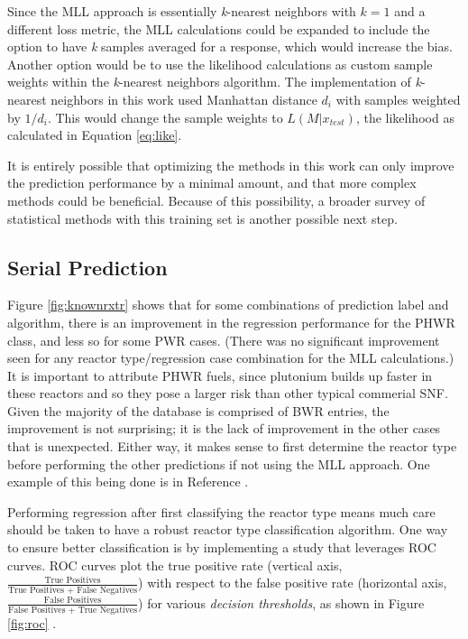 Since the \gls{MLL} approach is essentially \textit{k}-nearest neighbors with
$k=1$ and a different loss metric, the \gls{MLL} calculations could be expanded
to include the option to have \textit{k} samples averaged for a response, which
would increase the bias.  Another option would be to use the likelihood
calculations as custom sample weights within the \textit{k}-nearest neighbors
algorithm. The implementation of \textit{k}-nearest neighbors in this work used
Manhattan distance $d_i$ with samples weighted by $1/d_i$. This would change
the sample weights to $L(M|x_{test})$, the likelihood as calculated in Equation
\ref{eq:like}.

It is entirely possible that optimizing the methods in this work can only
improve the prediction performance by a minimal amount, and that more complex
methods could be beneficial. Because of this possibility, a broader survey of
statistical methods with this training set is another possible next step. 

\subsection{Serial Prediction}

Figure \ref{fig:knownrxtr} shows that for some combinations of prediction label
and algorithm, there is an improvement in the regression performance for the
\gls{PHWR} class, and less so for some \gls{PWR} cases.  (There was no
significant improvement seen for any reactor type/regression case combination
for the \gls{MLL} calculations.) It is important to attribute \gls{PHWR} fuels,
since plutonium builds up faster in these reactors and so they pose a larger
risk than other typical commerial \gls{SNF}.  Given the majority of the
database is comprised of \gls{BWR} entries, the improvement is not surprising;
it is the lack of improvement in the other cases that is unexpected. Either
way, it makes sense to first determine the reactor type before performing the
other predictions if not using the \gls{MLL} approach. One example of this
being done is in Reference \cite{serial_ml}.

Performing regression after first classifying the reactor type means much care
should be taken to have a robust reactor type classification algorithm. One way
to ensure better classification is by implementing a study that leverages
\gls{ROC} curves. \Gls{ROC} curves plot the true positive rate (vertical axis,
$\frac{\text{True Positives}}{\text{True Positives + False Negatives}}$) with
respect to the false positive rate (horizontal axis, $\frac{\text{False
Positives}}{\text{False Positives + True Negatives}}$) for various
\textit{decision thresholds}, as shown in Figure \ref{fig:roc} \cite{roc}.

